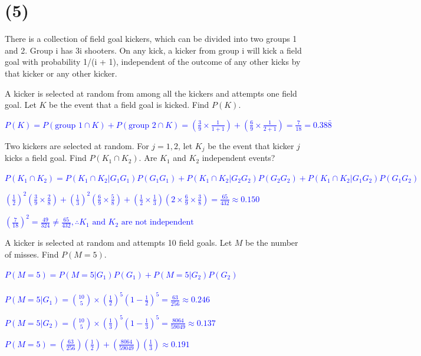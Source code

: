 \documentclass[12pt]{article}
\begin{document}
\section*{(5)}
There is a collection of field goal kickers, which can be divided into two groups 1
and 2. Group i has 3i shooters. On any kick, a kicker from group i will kick a field goal
with probability 1/(i + 1), independent of the outcome of any other kicks by that kicker
or any other kicker.
\begin{enumerate}
\item[(a)] A kicker is selected at random from among all the kickers and attempts one field goal. Let $K$ be the event that a field goal is kicked. Find $P(K)$.
\item[] \textcolor{blue}{$P(K) = P(\text{group 1} \cap K) + P(\text{group 2} \cap K) = (\frac{3}{9}\times \frac{1}{1+1}) + (\frac{6}{9}\times \frac{1}{2+1})= \frac{7}{18}= 0.38\bar{8}$}
\item[(b)] Two kickers are selected at random. For $j = 1, 2$, let $K_j$ be the event that kicker $j$ kicks a field goal. Find $P(K_1 \cap K_2)$. Are $K_1$ and $K_2$ independent events?
\item[] \textcolor{blue}{\small $P(K_1 \cap K_2) = P(K_1 \cap K_2 | G_1G_1) P(G_1G_1) + P(K_1 \cap K_2 | G_2G_2) P(G_2G_2) + P(K_1 \cap K_2 |G_1 G_2) P(G_1  G_2) $
\item[] 
$\left(\frac{1}{2}\right)^{2}\left(\frac{3}{9}\times\frac{2}{8}\right) + \left(\frac{1}{3}\right)^{2}\left(\frac{6}{9}\times\frac{5}{8}\right) + \left(\frac{1}{2}\times\frac{1}{3}\right)\left(2\times\frac{6}{9}\times\frac{3}{8}\right) = \frac{65}{432} \approx 0.150$ }

\textcolor{blue}{$\left(\frac{7}{18}\right)^2 = \frac{49}{324} \neq \frac{65}{432}, \therefore K_1 \text{ and } K_2 \text{ are not independent}$}

\item[(c)] A kicker is selected at random and attempts 10 field goals. Let $M$ be the number of misses. Find $P(M = 5)$.
\item[] 
\textcolor{blue}{$P(M=5)= P(M=5|G_1)P(G_1) +P(M=5|G_2)P(G_2)$}
\\\\
\textcolor{blue}{$P(M=5|G_1) = \binom{10}{5}\times (\frac{1}{2})^5 (1-\frac{1}{2})^5 = \frac{63}{256} \approx 0.246$}

\textcolor{blue}{$P(M=5|G_2) = \binom{10}{5}\times (\frac{1}{3})^5 (1-\frac{1}{3})^5 = \frac{8064}{59049} \approx 0.137$}

\textcolor{blue}{$P(M=5)= (\frac{63}{256})(\frac{1}{2}) +(\frac{8064}{59049} )(\frac{1}{3}) \approx 0.191$}
\end{enumerate}
\end{document}
